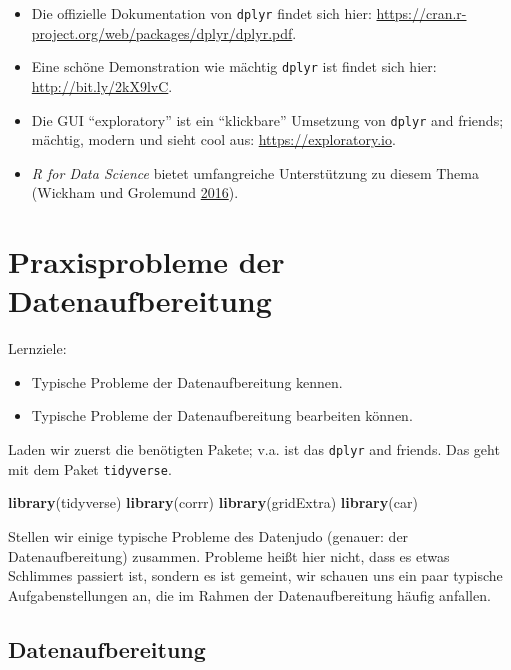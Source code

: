\documentclass[12pt,ngerman,]{book}
\makeatletter
\newenvironment{Shaded}{\begin{snugshade}}{\end{snugshade}}
\newcommand{\KeywordTok}[1]{\textcolor[rgb]{0.13,0.29,0.53}{\textbf{#1}}}
\newcommand{\NormalTok}[1]{#1}
\providecommand{\tightlist}{%
  \setlength{\itemsep}{0pt}\setlength{\parskip}{0pt}}
\newenvironment{kframe}{%
\medskip{}
\setlength{\fboxsep}{.8em}
 \def\at@end@of@kframe{}%
 \ifinner\ifhmode%
  \def\at@end@of@kframe{\end{minipage}}%
  \begin{minipage}{\columnwidth}%
 \fi\fi%
 \def\FrameCommand##1{\hskip\@totalleftmargin \hskip-\fboxsep
 \colorbox{shadecolor}{##1}\hskip-\fboxsep
     \hskip-\linewidth \hskip-\@totalleftmargin \hskip\columnwidth}%
 \MakeFramed {\advance\hsize-\width
   \@totalleftmargin\z@ \linewidth\hsize
   \@setminipage}}%
 {\par\unskip\endMakeFramed%
 \at@end@of@kframe}
\renewenvironment{Shaded}{\begin{kframe}}{\end{kframe}}
\theoremstyle{definition}
\theoremstyle{definition}
\theoremstyle{remark}
\let\BeginKnitrBlock\begin \let\EndKnitrBlock\end
\makeatother
\begin{document}
\begin{itemize}
\item
  Die offizielle Dokumentation von \texttt{dplyr} findet sich hier:
  \url{https://cran.r-project.org/web/packages/dplyr/dplyr.pdf}.
\item
  Eine schöne Demonstration wie mächtig \texttt{dplyr} ist findet sich
  hier: \url{http://bit.ly/2kX9lvC}.
\item
  Die GUI ``exploratory'' ist ein ``klickbare'' Umsetzung von
  \texttt{dplyr} and friends; mächtig, modern und sieht cool aus:
  \url{https://exploratory.io}.
\item
  \emph{R for Data Science} bietet umfangreiche Unterstützung zu diesem
  Thema (Wickham und Grolemund \protect\hyperlink{ref-r4ds}{2016}).
\end{itemize}

\chapter{Praxisprobleme der
Datenaufbereitung}\label{praxisprobleme-der-datenaufbereitung}

\BeginKnitrBlock{rmdcaution}
Lernziele:

\begin{itemize}
\tightlist
\item
  Typische Probleme der Datenaufbereitung kennen.
\item
  Typische Probleme der Datenaufbereitung bearbeiten können.
\end{itemize}
\EndKnitrBlock{rmdcaution}

Laden wir zuerst die benötigten Pakete; v.a. ist das \texttt{dplyr} and
friends. Das geht mit dem Paket \texttt{tidyverse}.

\begin{Shaded}
\begin{Highlighting}[]
\KeywordTok{library}\NormalTok{(tidyverse)}
\KeywordTok{library}\NormalTok{(corrr)}
\KeywordTok{library}\NormalTok{(gridExtra)}
\KeywordTok{library}\NormalTok{(car)}
\end{Highlighting}
\end{Shaded}

Stellen wir einige typische Probleme des Datenjudo (genauer: der
Datenaufbereitung) zusammen. Probleme heißt hier nicht, dass es etwas
Schlimmes passiert ist, sondern es ist gemeint, wir schauen uns ein paar
typische Aufgabenstellungen an, die im Rahmen der Datenaufbereitung
häufig anfallen.

\section{Datenaufbereitung}\label{datenaufbereitung}
\end{document}
